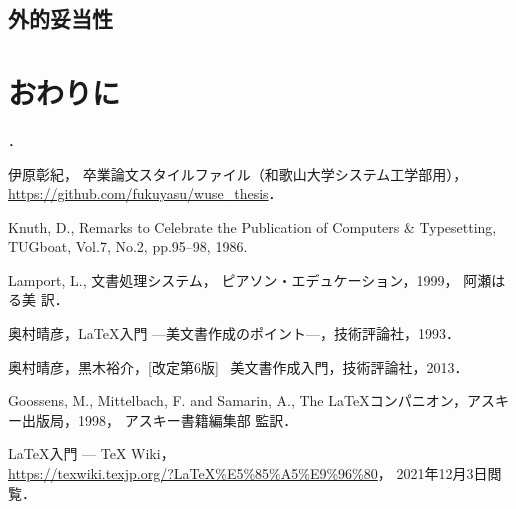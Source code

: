 \documentclass[11pt]{jreport}
\begin{document}
\section {外的妥当性}

\chapter{おわりに}




\begin{acknowledgements}
．
\end{acknowledgements}


\begin{thebibliography}{99}

  伊原彰紀，
  卒業論文スタイルファイル（和歌山大学システム工学部用），\\
  \url{https://github.com/fukuyasu/wuse_thesis}．

  Knuth, D.,
  Remarks to Celebrate the Publication of Computers \& Typesetting,
  TUGboat, Vol.7, No.2, pp.95--98, 1986.

  Lamport, L.,
  文書処理システム\LaTeXe{}，
  ピアソン・エデュケーション，1999，
  \newblock{}阿瀬はる美 訳．

  奥村晴彦，\LaTeX{}入門 ---美文書作成のポイント---，技術評論社，1993．

  奥村晴彦，黒木裕介，[改定第6版] \LaTeXe~美文書作成入門，技術評論社，2013．

  Goossens, M., Mittelbach, F. and Samarin, A.,
  The \LaTeX{}コンパニオン，アスキー出版局，1998，
  \newblock{}アスキー書籍編集部 監訳．

  \LaTeX 入門 --- \TeX{} Wiki，\\
  \url{https://texwiki.texjp.org/?LaTeX%E5%85%A5%E9%96%80}，
  2021年12月3日閲覧．
\end{thebibliography}


% 
% 
% 

\end{document}
